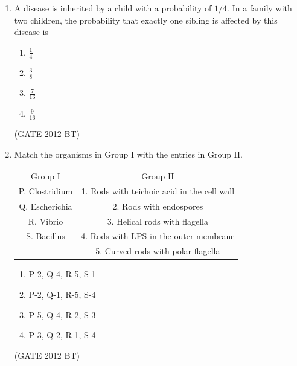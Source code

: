 \documentclass[journal,12pt,onecolumn]{IEEEtran}
\theoremstyle{remark}
\begin{document}
\begin{enumerate}
Assertion: Cell mass yield of a methylotrophic yeast is more on methanol compared to glucose.\\
Reason:	Methanol has a greater degree of reductance compared to glucose.
\begin{multicols}{2}
\begin{enumerate}
\item	Both  and  are correct and  is the correct reason for 
\item 	{} is correct,  is false
\item 	{} is false,  is correct
\item 	Both  and  are correct but  is not the correct reason for 
\end{enumerate}
\end{multicols} \hfill(GATE 2012 BT)

\item 	A disease is inherited by a child with a probability of $1/4$. In a family with two children, the probability that exactly one sibling is affected by this disease is
\begin{multicols}{4}
\begin{enumerate}
\item $\frac{1}{4}$ 	
\item $\frac{3}{8}$
\item $\frac{7}{16}$
\item $\frac{9}{16}$
\end{enumerate}
\end{multicols} \hfill(GATE 2012 BT)

 
\item Match the organisms in Group I with the entries in Group II.\\

 \begin{tabular}{c c}
    Group I&	Group II\\
P.	Clostridium	&1.	Rods with teichoic acid in the cell wall\\
Q.	Escherichia	&2.	Rods with endospores\\
R.	Vibrio	&3.	Helical rods with flagella\\
S.	Bacillus	&4.	Rods with LPS in the outer membrane\\
&5.	Curved rods with polar flagella
\end{tabular}
\begin{multicols}{4}
\begin{enumerate}
\item	P-2, Q-4, R-5, S-1
\item  P-2, Q-1, R-5, S-4
\item  P-5, Q-4, R-2, S-3	
\item  P-3, Q-2, R-1, S-4
\end{enumerate}
\end{multicols} \hfill(GATE 2012 BT)


\end{enumerate}
\end{document}
